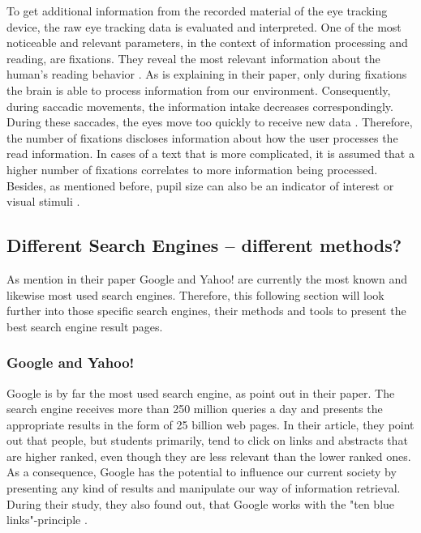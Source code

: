 To get additional information from the recorded material of the eye tracking device, the raw eye tracking data is evaluated and interpreted. One of the most noticeable and relevant parameters, in the context of information processing and reading, are fixations. They reveal the most relevant information about the human's reading behavior \autocite{pan2007google}. As \textcite{rayner1998eye} is explaining in their paper, only during fixations the brain is able to process information from our environment. Consequently, during saccadic movements, the information intake decreases correspondingly. During these saccades, the eyes move too quickly to receive new data \autocite{rayner1998eye}. 
Therefore, the number of fixations discloses information about how the user processes the read information. In cases of a text that is more complicated, it is assumed that a higher number of fixations correlates to more information being processed. Besides, as mentioned before, pupil size can also be an indicator of interest or visual stimuli \autocite{pan2007google}.

\subsection{Different Search Engines -- different methods?}
\label{subsection:SearchEngine}
As \textcite{pan2007google, agrawal2015study} mention in their paper Google and Yahoo! are currently the most known and likewise most used search engines. Therefore, this following section will look further into those specific search engines, their methods and tools to present the best search engine result pages. 

\subsubsection{Google and Yahoo!}
Google is by far the most used search engine, as \textcite{pan2007google} point out in their paper. The search engine receives more than 250 million queries a day and presents the appropriate results in the form of 25 billion web pages. In their article, they point out that people, but students primarily, tend to click on links and abstracts that are higher ranked, even though they are less relevant than the lower ranked ones. As a consequence, Google has the potential to influence our current society by presenting any kind of results and manipulate our way of information retrieval. During their study, they also found out, that Google works with the "ten blue links"-principle \autocite{pan2007google}.

